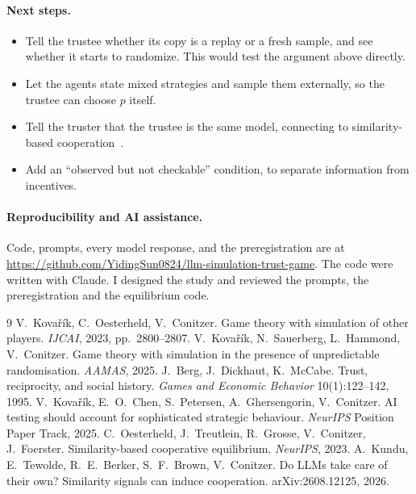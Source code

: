 \documentclass[11pt]{article}
\begin{document}
\paragraph{Next steps.}
\begin{itemize}[nosep]
  \item Tell the trustee whether its copy is a replay or a fresh sample, and see whether it starts to randomize. This would test the argument above directly.
  \item Let the agents state mixed strategies and sample them externally, so the trustee can choose $p$ itself.
  \item Tell the truster that the trustee is the same model, connecting to similarity-based cooperation~\cite{oesterheld2023,kundu2026}.
  \item Add an ``observed but not checkable'' condition, to separate information from incentives.
\end{itemize}

\paragraph{Reproducibility and AI assistance.} Code, prompts, every model response, and the preregistration are at \url{https://github.com/YidingSun0824/llm-simulation-trust-game}. The code were written with Claude. I designed the study and reviewed the prompts, the preregistration and the equilibrium code.


\begin{thebibliography}{9}\small
{} V.~Kova\v{r}\'ik, C.~Oesterheld, V.~Conitzer. Game theory with simulation of other players. \emph{IJCAI}, 2023, pp.~2800--2807.
 V.~Kova\v{r}\'ik, N.~Sauerberg, L.~Hammond, V.~Conitzer. Game theory with simulation in the presence of unpredictable randomisation. \emph{AAMAS}, 2025.
 J.~Berg, J.~Dickhaut, K.~McCabe. Trust, reciprocity, and social history. \emph{Games and Economic Behavior} 10(1):122--142, 1995.
 V.~Kova\v{r}\'ik, E.~O.~Chen, S.~Petersen, A.~Ghersengorin, V.~Conitzer. AI testing should account for sophisticated strategic behaviour. \emph{NeurIPS} Position Paper Track, 2025.
 C.~Oesterheld, J.~Treutlein, R.~Grosse, V.~Conitzer, J.~Foerster. Similarity-based cooperative equilibrium. \emph{NeurIPS}, 2023.
 A.~Kundu, E.~Tewolde, R.~E.~Berker, S.~F.~Brown, V.~Conitzer. Do LLMs take care of their own? Similarity signals can induce cooperation. arXiv:2608.12125, 2026.
\end{thebibliography}
\end{document}
